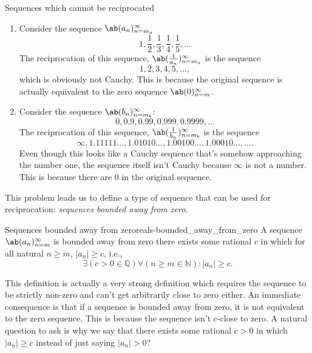 \begin{exmp}{Sequences which cannot be reciprocated}{}
  \begin{enumerate}
    \item Consider the sequence $\sequence{a_n}{n = m_a}{\infty}$
          \begin{equation}
            1, \frac{1}{2}, \frac{1}{3}, \frac{1}{4}, \frac{1}{5}, \dots
          \end{equation}
          The reciprocation of this sequence, $\sequence{\frac{1}{a_n}}{n = m_a}{\infty}$
          is the sequence
          \begin{equation}
            1, 2, 3, 4, 5, \dots,
          \end{equation}
          which is obviously not Cauchy. This is because the original sequence is
          actually equivalent to the zero sequence $\sequence{0}{n = m}{\infty}$.
    \item Consider the sequence $\sequence{b_n}{n = m_b}{\infty}$:
          \begin{equation}
            0, 0.9, 0.99, 0.999, 0.9999, \dots
          \end{equation}
          The reciprocation of this sequence, $\sequence{\frac{1}{b_n}}{n = m_b}{\infty}$
          is the sequence
          \begin{equation}
            \infty, 1.11111\dots, 1.01010\dots, 1.00100\dots, 1.00010\dots, \dots.
          \end{equation}
          Even though this looks like a Cauchy sequence that's somehow approaching
          the number one, the sequence itself isn't Cauchy because $\infty$ is not a
          number. This is because there are $0$ in the original sequence.
  \end{enumerate}
\end{exmp}
This problem leads us to define a type of sequence that can be used for reciprocation:
\emph{sequences bounded away from zero}.
\begin{df}{Sequences bounded away from zero}{reals-bounded_away_from_zero}
  A sequence $\sequence{a_n}{n = m}{\infty}$ is bounded away from zero \ifft there
  exists some rational $c$ in which for all natural $n \geq m$, $| a_n | \geq c$, i.e.,
  \begin{equation}
    \exists (c > 0 \in \mathbb{Q}) \forall (n \geq m \in \mathbb{N}) : | a_n | \geq c.
  \end{equation}
\end{df}

This definition is actually a very strong definition which requires the sequence to be
strictly non-zero and can't get arbitrarily close to zero either. An immediate consequence
is that if a sequence is bounded away from zero, it is not equivalent to the zero sequence.
This is because the sequence isn't $c$-close to zero. A natural question to ask is why we say that
there exists some rational $c > 0$ in which $| a_n | \geq c$ instead of just saying $| a_n | > 0$?

